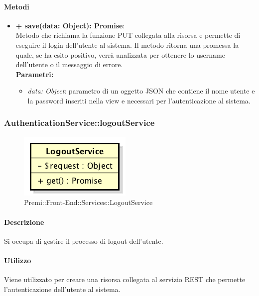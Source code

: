 		\paragraph{Metodi}
		\begin{itemize}
			\item \textbf{+ save(data: Object): Promise}:\\
			Metodo che richiama la funzione PUT collegata alla risorsa e permette di eseguire il login dell'utente al sistema. Il metodo ritorna una promessa la quale, se ha esito positivo, verrà analizzata per ottenere lo username dell'utente o il messaggio di errore. \\
			\textbf{Parametri:}\\
			\begin{itemize}
				\item \textit{data: Object}: parametro di un oggetto JSON che contiene il nome utente e la password inseriti nella view e necessari per l'autenticazione al sistema.
			\end{itemize}
		\end{itemize}
\newpage
		
		
		\subsubsection{AuthenticationService::logoutService}
		\begin{figure}[h]
			\centering
				\includegraphics[width=0.4\linewidth]{img/premi_front_end_services_logoutservice}
			\caption[Premi::Front-End::Services::LogoutService]{Premi::Front-End::Services::LogoutService}
		\end{figure}
		
		\paragraph{Descrizione}
		Si occupa di gestire il processo di logout dell'utente.
		
		\paragraph{Utilizzo}
		Viene utilizzato per creare una risorsa collegata al servizio REST che permette l'autenticazione dell'utente al sistema.
		
